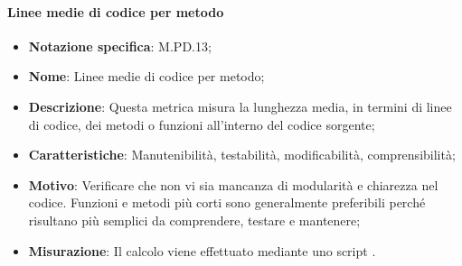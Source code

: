\paragraph*{Linee medie di codice per metodo}
\begin{itemize}
    \item \textbf{Notazione specifica}: M.PD.13;
    \item \textbf{Nome}: Linee medie di codice per metodo;
    \item \textbf{Descrizione}: Questa metrica misura la lunghezza media, in termini di linee di codice, dei metodi o funzioni all'interno del codice sorgente;
    \item \textbf{Caratteristiche}: Manutenibilità, testabilità, modificabilità, comprensibilità;
    \item \textbf{Motivo}: Verificare che non vi sia mancanza di modularità e chiarezza nel codice. Funzioni e metodi più corti sono generalmente preferibili perché risultano più semplici da comprendere, testare e mantenere; 
    \item \textbf{Misurazione}: Il calcolo viene effettuato mediante uno script .
\end{itemize}
